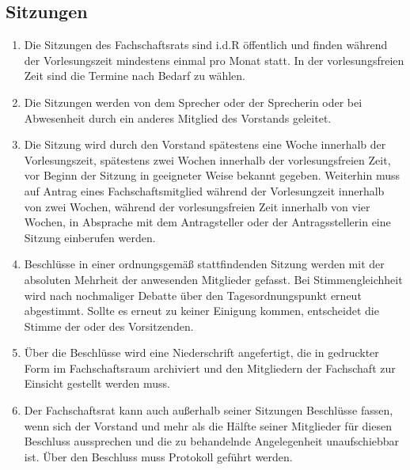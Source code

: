 \subsection{Sitzungen}
\begin{enumerate}
\item Die Sitzungen des Fachschaftsrats sind i.d.R öffentlich und finden während der Vorlesungszeit mindestens einmal pro Monat statt. In der vorlesungsfreien Zeit sind die Termine nach Bedarf zu wählen.
\item Die Sitzungen werden von dem Sprecher oder der Sprecherin oder bei Abwesenheit durch ein anderes Mitglied des Vorstands geleitet.
\item Die Sitzung wird durch den Vorstand spätestens eine Woche innerhalb der Vorlesungszeit, spätestens zwei Wochen innerhalb der vorlesungsfreien Zeit, vor Beginn der Sitzung in geeigneter Weise bekannt gegeben. Weiterhin muss auf Antrag eines Fachschaftsmitglied während der Vorlesungzeit innerhalb von zwei Wochen, während der vorlesungsfreien Zeit innerhalb von vier Wochen, in Absprache mit dem Antragsteller oder der Antragsstellerin eine Sitzung einberufen werden.
\item Beschlüsse in einer ordnungsgemäß stattfindenden Sitzung werden mit der absoluten Mehrheit der anwesenden Mitglieder gefasst. Bei Stimmengleichheit wird nach nochmaliger Debatte über den Tagesordnungspunkt erneut abgestimmt. Sollte es erneut zu keiner Einigung kommen, entscheidet die Stimme der oder des Vorsitzenden.
\item Über die Beschlüsse wird eine Niederschrift angefertigt, die in gedruckter Form im Fachschaftsraum archiviert und den Mitgliedern der Fachschaft zur Einsicht gestellt werden muss.
\item Der Fachschaftsrat kann auch außerhalb seiner Sitzungen Beschlüsse fassen, wenn sich der Vorstand und mehr als die Hälfte seiner Mitglieder für diesen Beschluss aussprechen und die zu behandelnde Angelegenheit unaufschiebbar ist. Über den Beschluss muss Protokoll geführt werden.
\end{enumerate}
